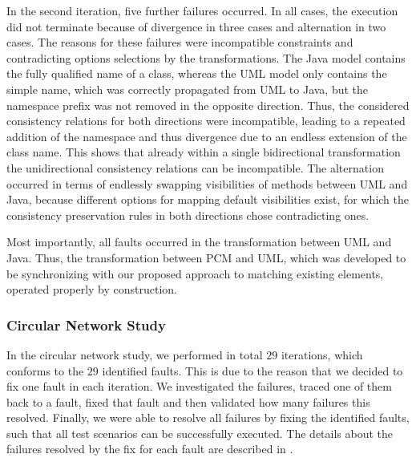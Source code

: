 In the second iteration, five further failures occurred.
In all cases, the execution did not terminate because of divergence in three cases and alternation in two cases.
The reasons for these failures were incompatible constraints and contradicting options selections by the transformations.
The Java model contains the fully qualified name of a class, whereas the \gls{UML} model only contains the simple name, which was correctly propagated from \gls{UML} to Java, but the namespace prefix was not removed in the opposite direction.
Thus, the considered consistency relations for both directions were incompatible, leading to a repeated addition of the namespace and thus divergence due to an endless extension of the class name.
This shows that already within a single bidirectional transformation the unidirectional consistency relations can be incompatible.
The alternation occurred in terms of endlessly swapping visibilities of methods between \gls{UML} and Java, because different options for mapping default visibilities exist, for which the consistency preservation rules in both directions chose contradicting ones. %

Most importantly, all faults occurred in the transformation between \gls{UML} and Java.
Thus, the transformation between \gls{PCM} and \gls{UML}, which was developed to be synchronizing with our proposed approach to matching existing elements, operated properly by construction.

\subsubsection*{Circular Network Study} 

In the circular network study, we performed in total $29$ iterations, which conforms to the $29$ identified faults.
This is due to the reason that we decided to fix one fault in each iteration.
We investigated the failures, traced one of them back to a fault, fixed that fault and then validated how many failures this resolved.
Finally, we were able to resolve all failures by fixing the identified faults, such that all test scenarios can be successfully executed.
The details about the failures resolved by the fix for each fault are described in \cite{saglam2020ma}.

